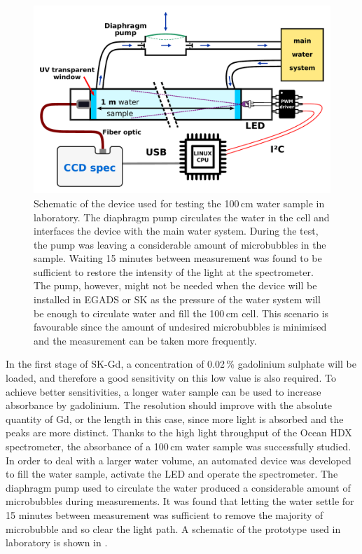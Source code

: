 \begin{figure}
	\centering
	\includegraphics[width=0.7\linewidth]{pics/Device.pdf}
	\caption[Schematic of the device used for testing the 100\,cm water sample]%
		{Schematic of the device used for testing the 100\,cm water sample in laboratory.
		The diaphragm pump circulates the water in the cell and interfaces the device with the main water system.
		During the test, the pump was leaving a considerable amount of microbubbles in the sample.
		Waiting 15 minutes between measurement was found to be sufficient to restore the intensity of the light at %
		the spectrometer.
		The pump, however, might not be needed when the device will be installed in EGADS or SK as the %
		pressure of the water system will be enough to circulate water and fill the 100\,cm cell.
		This scenario is favourable since the amount of undesired microbubbles is minimised and the %
		measurement can be taken more frequently.}
	\label{fig:gad_device}
\end{figure}

In the first stage of SK-Gd, a concentration of 0.02\,\% gadolinium sulphate %
will be loaded, and therefore a good sensitivity on this low value is also required.
To achieve better sensitivities, a longer water sample can be used to increase absorbance by gadolinium.
The resolution should improve with the absolute quantity of Gd, or the length in this case, %
since more light is absorbed and the peaks are more distinct.
Thanks to the high light throughput of the Ocean HDX spectrometer, %
the absorbance of a 100\,cm water sample was successfully studied.
In order to deal with a larger water volume, an automated device was developed to fill the water sample, %
activate the LED and operate the spectrometer.
The diaphragm pump used to circulate the water produced a considerable amount of microbubbles during measurements.
It was found that letting the water settle for 15 minutes between measurement was sufficient %
to remove the majority of microbubble and so clear the light path.
A schematic of the prototype used in laboratory is shown in .

